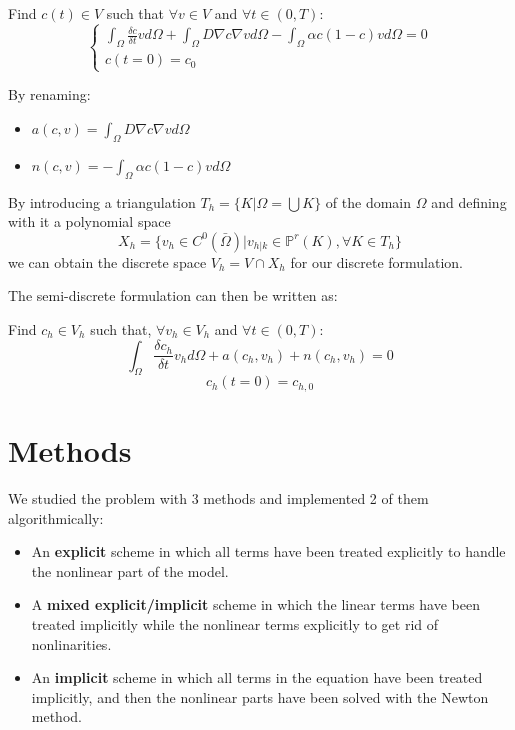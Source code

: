 \documentclass[12pt, letterpaper]{article}
\begin{document}
\vspace{1em}
\noindent Find $c(t)\in V$ such that $\forall v\in V$ and $\forall t\in(0,T)$:
$$\begin{cases}\int_\Omega\frac{\delta c}{\delta t}vd\Omega+\int_\Omega D\nabla c\nabla vd\Omega-\int_\Omega\alpha c(1-c)vd\Omega=0\\c(t=0)=c_0\end{cases}$$

\vspace{1em}
\noindent By renaming:
\begin{itemize}
    \item $a(c,v)=\int_\Omega D\nabla c\nabla vd\Omega$
    \item $n(c,v)=-\int_\Omega\alpha c(1-c)vd\Omega$
\end{itemize}

\noindent By introducing a triangulation $T_h=\{K|\Omega=\bigcup K\}$ of the domain $\Omega$ and defining with it a polynomial space $$X_h=\{v_h\in C^0(\bar\Omega)|v_{h|k}\in\mathbb{P}^r(K),\forall K\in T_h\}$$ we can obtain the discrete space $V_h=V\cap X_h$ for our discrete formulation.

\noindent The semi-discrete formulation can then be written as:

\vspace{1em}
\noindent
Find $c_h\in V_h$ such that, $\forall v_h\in V_h$ and $\forall t\in(0,T)$:
$$\int_\Omega\frac{\delta c_h}{\delta t}v_hd\Omega+a(c_h,v_h)+n(c_h,v_h)=0$$
$$c_h(t=0)=c_{h,0}$$

\section{Methods}

We studied the problem with 3 methods and implemented 2 of them algorithmically:
\begin{itemize}
    \item An \textbf{explicit} scheme in which all terms have been treated explicitly to handle the nonlinear part of the model.
    \item A \textbf{mixed explicit/implicit} scheme in which the linear terms have been treated implicitly while the nonlinear terms explicitly to get rid of nonlinarities.
    \item An \textbf{implicit} scheme in which all terms in the equation have been treated implicitly, and then the nonlinear parts have been solved with the Newton method.
\end{itemize}
\end{document}
